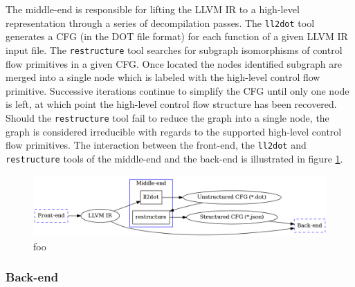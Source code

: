 The middle-end is responsible for lifting the LLVM IR to a high-level representation through a series of decompilation passes. The \texttt{ll2dot} tool generates a CFG (in the DOT file format) for each function of a given LLVM IR input file. The \texttt{restructure} tool searches for subgraph isomorphisms of control flow primitives in a given CFG. Once located the nodes identified subgraph are merged into a single node which is labeled with the high-level control flow primitive. Successive iterations continue to simplify the CFG until only one node is left, at which point the high-level control flow structure has been recovered. Should the \texttt{restructure} tool fail to reduce the graph into a single node, the graph is considered irreducible with regards to the supported high-level control flow primitives. The interaction between the front-end, the \texttt{ll2dot} and \texttt{restructure} tools of the middle-end and the back-end is illustrated in figure \ref{fig:middle-end}.

%

\begin{figure}[htbp]
	\begin{center}
		\includegraphics[width=\textwidth]{inc/middle-end.png}
		\caption{foo}
		\label{fig:middle-end}
	\end{center}
\end{figure}

\subsubsection{Back-end}




